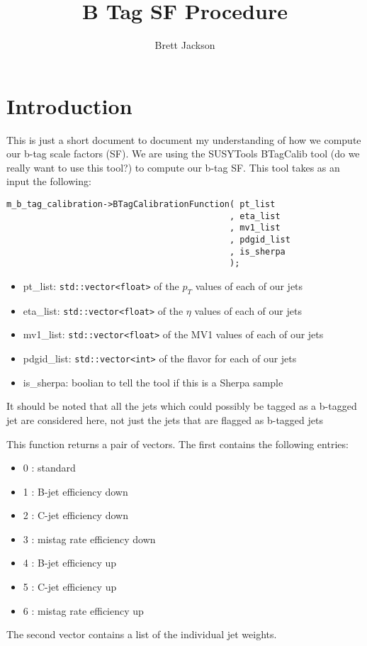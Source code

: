 \documentclass[12]{article}
\title{B Tag SF Procedure}
\author{Brett Jackson}
\begin{document}
\maketitle
\section{Introduction}
This is just a short document to document my understanding of how we compute our b-tag scale factors (SF).
We are using the SUSYTools BTagCalib tool ({\color{red}do we really want to use this tool?}) to compute our b-tag SF.
This tool takes as an input the following:

\begin{lstlisting}
m_b_tag_calibration->BTagCalibrationFunction( pt_list
                                            , eta_list
                                            , mv1_list
                                            , pdgid_list
                                            , is_sherpa
                                            );
\end{lstlisting}

\begin{itemize}
  \item pt\_list: \texttt{std::vector<float>} of the $p_T$ values of each of our jets
  \item eta\_list: \texttt{std::vector<float>} of the $\eta$ values of each of our jets
  \item mv1\_list: \texttt{std::vector<float>} of the MV1 values of each of our jets
  \item pdgid\_list: \texttt{std::vector<int>} of the flavor for each of our jets
  \item is\_sherpa: boolian to tell the tool if this is a Sherpa sample
\end{itemize}

It should be noted that all the jets which could possibly be tagged as a b-tagged jet are considered here, not just the jets that are flagged as b-tagged jets 

This function returns a pair of vectors. The first contains the following entries:
\begin{itemize}
\item 0 : standard
\item 1 : B-jet efficiency down
\item 2 : C-jet efficiency down
\item 3 : mistag rate efficiency down
\item 4 : B-jet efficiency up
\item 5 : C-jet efficiency up
\item 6 : mistag rate efficiency up
\end{itemize}
The second vector contains a list of the individual jet weights.
\end{document}
